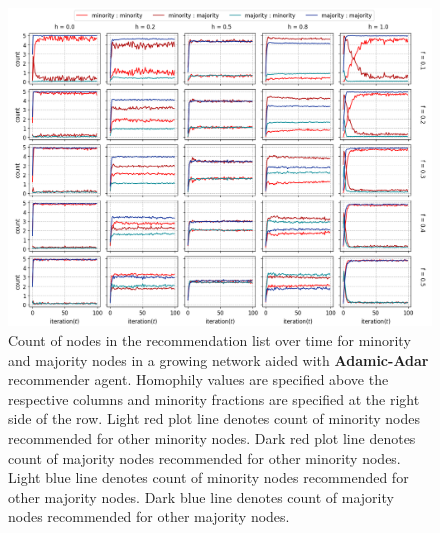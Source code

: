 \begin{appendices}
\begin{figure}[h!]
	\centering
	\includegraphics[width=1.0\textwidth]{images/count_aa.png}
	\caption{Count of nodes in the recommendation list over time for minority and majority nodes in a growing network aided with \textbf{Adamic-Adar} recommender agent. Homophily values are specified above the respective columns and minority fractions are specified at the right side of the row. Light red plot line denotes count of minority nodes recommended for other minority nodes. Dark red plot line denotes count of majority nodes recommended for other minority nodes. Light blue line denotes count of minority nodes recommended for other majority nodes. Dark blue line denotes count of majority nodes recommended for other majority nodes.}
	\label{count_aa}
\end{figure}



\end{appendices}
